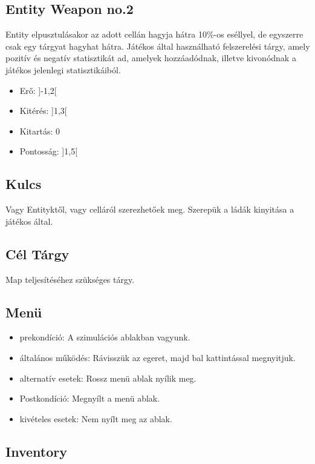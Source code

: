\subsection{Entity Weapon no.2}

Entity elpusztulásakor az adott cellán hagyja hátra 10\%-os eséllyel, de egyszerre csak egy tárgyat hagyhat hátra.
Játékos által használható felszerelési tárgy, amely pozitív és negatív statisztikát ad, amelyek hozzáadódnak, illetve kivonódnak a játékos jelenlegi statisztikáiból.

\begin{itemize}
    \item Erő: ]-1,2[
    \item Kitérés: ]1,3[
    \item Kitartás: 0
    \item Pontosság: ]1,5[
\end{itemize}

\subsection{Kulcs}

Vagy Entityktől, vagy celláról szerezhetőek meg.
Szerepük a ládák kinyitása a játékos által.

\subsection{Cél Tárgy}

Map teljesítéséhez szükséges tárgy.


\subsection{Menü}

\begin{itemize}
    \item prekondíció: A szimulációs ablakban vagyunk.
    \item általános működés: Rávisszük az egeret, majd bal kattintással megnyitjuk.
    \item alternatív esetek: Rossz menü ablak nyílik meg.
    \item Postkondíció: Megnyílt a menü ablak.
    \item kivételes esetek: Nem nyílt meg az ablak.
\end{itemize}

\subsection{Inventory}


